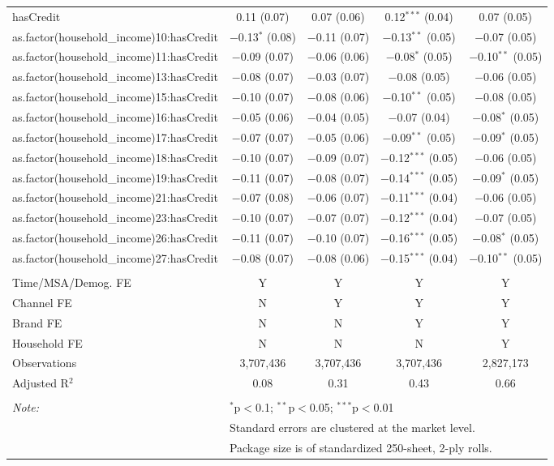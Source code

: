 \begin{table}[!htbp]
\begin{tabular}{@{\extracolsep{5pt}}lcccc}
  hasCredit & 0.11 (0.07) & 0.07 (0.06) & 0.12$^{***}$ (0.04) & 0.07 (0.05) \\ 
  as.factor(household\_income)10:hasCredit & $-$0.13$^{*}$ (0.08) & $-$0.11 (0.07) & $-$0.13$^{**}$ (0.05) & $-$0.07 (0.05) \\ 
  as.factor(household\_income)11:hasCredit & $-$0.09 (0.07) & $-$0.06 (0.06) & $-$0.08$^{*}$ (0.05) & $-$0.10$^{**}$ (0.05) \\ 
  as.factor(household\_income)13:hasCredit & $-$0.08 (0.07) & $-$0.03 (0.07) & $-$0.08 (0.05) & $-$0.06 (0.05) \\ 
  as.factor(household\_income)15:hasCredit & $-$0.10 (0.07) & $-$0.08 (0.06) & $-$0.10$^{**}$ (0.05) & $-$0.08 (0.05) \\ 
  as.factor(household\_income)16:hasCredit & $-$0.05 (0.06) & $-$0.04 (0.05) & $-$0.07 (0.04) & $-$0.08$^{*}$ (0.05) \\ 
  as.factor(household\_income)17:hasCredit & $-$0.07 (0.07) & $-$0.05 (0.06) & $-$0.09$^{**}$ (0.05) & $-$0.09$^{*}$ (0.05) \\ 
  as.factor(household\_income)18:hasCredit & $-$0.10 (0.07) & $-$0.09 (0.07) & $-$0.12$^{***}$ (0.05) & $-$0.06 (0.05) \\ 
  as.factor(household\_income)19:hasCredit & $-$0.11 (0.07) & $-$0.08 (0.07) & $-$0.14$^{***}$ (0.05) & $-$0.09$^{*}$ (0.05) \\ 
  as.factor(household\_income)21:hasCredit & $-$0.07 (0.08) & $-$0.06 (0.07) & $-$0.11$^{***}$ (0.04) & $-$0.06 (0.05) \\ 
  as.factor(household\_income)23:hasCredit & $-$0.10 (0.07) & $-$0.07 (0.07) & $-$0.12$^{***}$ (0.04) & $-$0.07 (0.05) \\ 
  as.factor(household\_income)26:hasCredit & $-$0.11 (0.07) & $-$0.10 (0.07) & $-$0.16$^{***}$ (0.05) & $-$0.08$^{*}$ (0.05) \\ 
  as.factor(household\_income)27:hasCredit & $-$0.08 (0.07) & $-$0.08 (0.06) & $-$0.15$^{***}$ (0.04) & $-$0.10$^{**}$ (0.05) \\ 
 \hline \\[-1.8ex] 
Time/MSA/Demog. FE & Y & Y & Y & Y \\ 
Channel FE & N & Y & Y & Y \\ 
Brand FE & N & N & Y & Y \\ 
Household FE & N & N & N & Y \\ 
Observations & 3,707,436 & 3,707,436 & 3,707,436 & 2,827,173 \\ 
Adjusted R$^{2}$ & 0.08 & 0.31 & 0.43 & 0.66 \\ 
\hline 
\hline \\[-1.8ex] 
\textit{Note:}  & \multicolumn{4}{l}{$^{*}$p$<$0.1; $^{**}$p$<$0.05; $^{***}$p$<$0.01} \\ 
 & \multicolumn{4}{l}{Standard errors are clustered at the market level.} \\ 
 & \multicolumn{4}{l}{Package size is of standardized 250-sheet, 2-ply rolls.} \\ 
\end{tabular} 
\end{table} 
